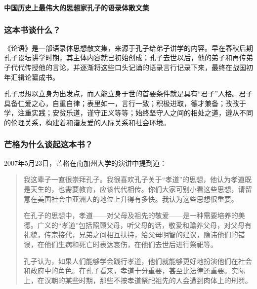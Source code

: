 \cleardoublepage
{}


\begin{BookSummaryBox}
\textbf{中国历史上最伟大的思想家孔子的语录体散文集}
\par
\end{BookSummaryBox}

\subsubsection*{这本书谈什么？}

《论语》是一部语录体思想散文集，来源于孔子给弟子讲学的内容。早在春秋后期孔子设坛讲学时期，其主体内容就已初始创成；孔子去世以后，他的弟子和再传弟子代代传授他的言论，并逐渐将这些口头记诵的语录言行记录下来，最终在战国初年汇辑论纂成书。
\par

孔子思想以立身为出发点，而人能立身于世的首要条件就是具有“君子”人格。君子具备仁爱之心，自重自律；表里如一，言行一致；积极进取，德才兼备；孜孜于学，注重实践；安贫乐道，谨守正义等等；始终坚守人之间的相处之道，遵从不同的伦理关系，构建着和谐友爱的人际关系和社会环境。
\par

\subsubsection*{芒格为什么谈起这本书？}

2007年5月23日，芒格在南加州大学的演讲中提到道：
\par

\begin{quotation}
我这辈子一直很崇拜孔子。我很喜欢孔子关于“孝道”的思想，他认为孝道既是天生的，也需要教育，应该代代相传。你们大家可别小看这些思想，请留意在美国社会中亚洲人的地位上升得有多快。我认为这些思想很重要。
\par

在孔子的思想中，孝道——对父母及祖先的敬爱——是一种需要培养的美德。广义的“孝道”包括照顾父母，听父母的话，敬爱和赡养父母，对父母有礼貌，传宗接代，兄弟之间相互扶持，给父母明智的建议，隐讳他们的错误，在他们生病和死亡时表达哀伤，在他们去世后进行祭祀等。
\par

孔子认为，如果人们能够学会践行孝道，他们就能够更好地扮演他们在社会和政府中的角色。在孔子看来，孝道十分重要，甚至比法律还重要。实际上，在汉朝的某些时期，那些不按孝道祭祀祖先的人会遭到肉体上的刑罚。
\par
\end{quotation}

